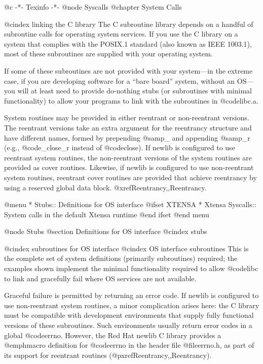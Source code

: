 @c                                           -*- Texinfo -*-
@node Syscalls
@chapter System Calls

@cindex linking the C library
The C subroutine library depends on a handful of subroutine calls for
operating system services.  If you use the C library on a system that
complies with the POSIX.1 standard (also known as IEEE 1003.1), most of
these subroutines are supplied with your operating system.

If some of these subroutines are not provided with your system---in
the extreme case, if you are developing software for a ``bare board''
system, without an OS---you will at least need to provide do-nothing
stubs (or subroutines with minimal functionality) to allow your
programs to link with the subroutines in @code{libc.a}.

System routines may be provided in either reentrant or non-reentrant
versions.  The reentrant versions take an extra argument for the
reentrancy structure and have different names, formed by prepending
@samp{_} and appending @samp{_r} (e.g., @code{_close_r} instead of
@code{close}).  If newlib is configured to use reentrant system
routines, the non-reentrant versions of the system routines are provided
as cover routines.  Likewise, if newlib is configured to use
non-reentrant system routines, reentrant cover routines are provided
that achieve reentrancy by using a reserved global data block.
@xref{Reentrancy,,Reentrancy}.

@menu
* Stubs::		Definitions for OS interface
@ifset XTENSA
* Xtensa Syscalls::     System calls in the default Xtensa runtime
@end ifset
@end menu

@node Stubs
@section Definitions for OS interface
@cindex stubs

@cindex subroutines for OS interface
@cindex OS interface subroutines
This is the complete set of system definitions (primarily subroutines)
required; the examples shown implement the minimal functionality
required to allow @code{libc} to link and gracefully fail where OS
services are not available.  

Graceful failure is permitted by returning an error code.  If newlib is
configured to use non-reentrant system routines, a minor
complication arises here: the C library must be compatible with
development environments that supply fully functional versions of these
subroutines.  Such environments usually return error codes in a global
@code{errno}.  However, the Red Hat newlib C library provides a @emph{macro}
definition for @code{errno} in the header file @file{errno.h}, as part
of its support for reentrant routines (@pxref{Reentrancy,,Reentrancy}).

